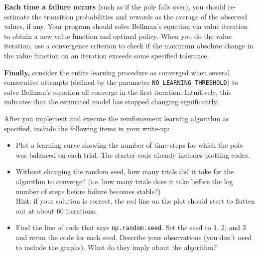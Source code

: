   \textbf{Each time a failure occurs} (such as if the pole falls over), you should 
  re-estimate the transition probabilities and rewards as the average of 
  the observed values, if any.  Your program should solve Bellman's equation via value iteration 
  to obtain a new value function and optimal policy.  When you do the value iteration, use a 
  convergence criterion to check if the maximum absolute change in the 
  value function on an iteration exceeds some specified tolerance. 

  \textbf{Finally,} consider the entire learning procedure as converged 
  when several consecutive attempts (defined by the parameter 
  {\tt NO\_LEARNING\_THRESHOLD}) to solve Bellman's
  equation all converge in the first iteration. Intuitively, this
  indicates that the estimated model has stopped changing significantly.

  After you implement and execute the reinforcement learning algorithm as specified, include the following items in your write-up:

\begin{itemize}
\item  Plot a learning curve showing the number of time-steps for which the
  pole was balanced on each trial. The starter code already includes plotting codes.
\item  Without changing the random seed, how many trials did it take for the algorithm to converge? (i.e. how many trials does it take before the log number of steps before failure becomes stable?) \\
  Hint: if your solution is correct, the red line on the plot should start to flatten out at about 60 iterations.
\item  Find the line of code that says {\tt np.random.seed}. Set the seed to 1, 2, and 3 and rerun the code for each seed. Describe your observations (you don't need to include the graphs). What do they imply about the algorithm? 

\end{itemize}

\ifnum{} {
  
} \fi
